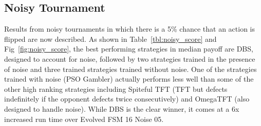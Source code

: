 \documentclass[10pt,letterpaper]{article}
\begin{document}
\subsection*{Noisy Tournament}\label{sec:noise}

Results from noisy tournaments in which there is a 5\% chance that an action is
flipped are now described. As shown in Table~\ref{tbl:noisy_score} and
Fig~\ref{fig:noisy_score}, the best performing strategies in median payoff
are DBS, designed to account for noise, followed by two strategies trained in
the presence of noise and three trained strategies trained without noise. One of
the strategies trained with noise (PSO Gambler) actually performs less well than
some of the other high ranking strategies including
Spiteful TFT (TFT but defects indefinitely if the opponent defects twice
consecutively) and OmegaTFT (also designed to handle noise). While DBS is the clear
winner, it comes at a 6x increased run time over Evolved FSM 16 Noise 05.
\end{document}
